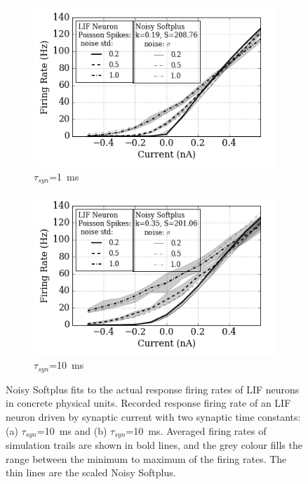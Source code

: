 \documentclass{article}
\begin{document}
\begin{figure}
	\centering
	\begin{subfigure}[t]{0.49\textwidth}
		\includegraphics[width=\textwidth]{pics_iconip/4-1.png}
		\caption{$\tau_{syn}$=1~ms}
	\end{subfigure}
	\begin{subfigure}[t]{0.49\textwidth}
		\includegraphics[width=\textwidth]{pics_iconip/4-10.png}
		\caption{$\tau_{syn}$=10~ms}
	\end{subfigure}
	\caption{Noisy Softplus fits to the actual response firing rates of LIF neurons in concrete physical units.
	Recorded response firing rate of an LIF neuron driven by synaptic current with two synaptic time constants: (a) $\tau_{syn}$=10~ms and (b) $\tau_{syn}$=10~ms. Averaged firing rates of simulation trails are shown in bold lines, and the grey colour fills the range between the minimum to maximum of the firing rates. The thin lines are the scaled Noisy Softplus.}
	\label{Fig:nsptau1}
\end{figure}
\end{document}
